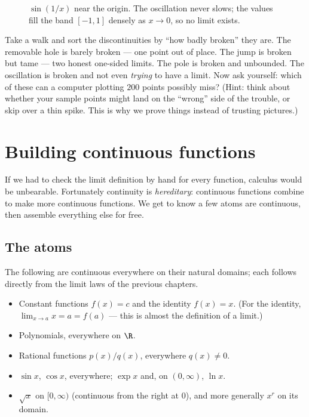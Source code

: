 \begin{figure}[H]
\centering
{}
\caption{$\sin(1/x)$ near the origin. The oscillation never slows; the values fill the
band $[-1,1]$ densely as $x\to 0$, so no limit exists.}
\label{ch08:fig-osc}
\end{figure}

\begin{walkbox}
Take a walk and sort the discontinuities by ``how badly broken'' they are. The removable
hole is barely broken --- one point out of place. The jump is broken but tame --- two
honest one-sided limits. The pole is broken and unbounded. The oscillation is broken and
not even \emph{trying} to have a limit. Now ask yourself: which of these can a computer
plotting $200$ points possibly miss? (Hint: think about whether your sample points might
land on the ``wrong'' side of the trouble, or skip over a thin spike. This is why we prove
things instead of trusting pictures.)
\end{walkbox}

\section{Building continuous functions}
\label{ch08:building}

If we had to check the limit definition by hand for every function, calculus would be
unbearable. Fortunately continuity is \emph{hereditary}: continuous functions combine to
make more continuous functions. We get to know a few atoms are continuous, then assemble
everything else for free.

\subsection{The atoms}

The following are continuous everywhere on their natural domains; each follows directly
from the limit laws of the previous chapters.

\begin{itemize}
  \item Constant functions $f(x)=c$ and the identity $f(x)=x$. (For the identity,
        $\lim_{x\to a}x=a=f(a)$ --- this is almost the definition of a limit.)
  \item Polynomials, everywhere on $\R$.
  \item Rational functions $p(x)/q(x)$, everywhere $q(x)\ne 0$.
  \item $\sin x$, $\cos x$, everywhere; $\exp x$ and, on $(0,\infty)$, $\ln x$.
  \item $\sqrt{x}$ on $[0,\infty)$ (continuous from the right at $0$), and more
        generally $x^r$ on its domain.
\end{itemize}

